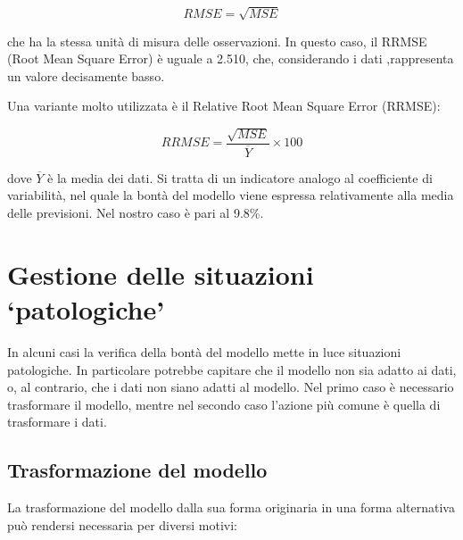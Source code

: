 \documentclass[a4paper,12pt,oneside]{book}
\theoremstyle{definition}
\theoremstyle{definition}
\theoremstyle{definition}
\theoremstyle{remark}
\begin{document}
\[RMSE = \sqrt{MSE}\]

che ha la stessa unità di misura delle osservazioni. In questo caso, il
RRMSE (Root Mean Square Error) è uguale a 2.510, che, considerando i
dati ,rappresenta un valore decisamente basso.

Una variante molto utilizzata è il Relative Root Mean Square Error
(RRMSE):

\[RRMSE = \frac{\sqrt{MSE}} {\overline{Y}} \times 100\]

dove \(\overline{Y}\) è la media dei dati. Si tratta di un indicatore
analogo al coefficiente di variabilità, nel quale la bontà del modello
viene espressa relativamente alla media delle previsioni. Nel nostro
caso è pari al 9.8\%.

\section{\texorpdfstring{Gestione delle situazioni
`patologiche'}{Gestione delle situazioni patologiche}}\label{gestione-delle-situazioni-patologiche}

In alcuni casi la verifica della bontà del modello mette in luce
situazioni patologiche. In particolare potrebbe capitare che il modello
non sia adatto ai dati, o, al contrario, che i dati non siano adatti al
modello. Nel primo caso è necessario trasformare il modello, mentre nel
secondo caso l'azione più comune è quella di trasformare i dati.

\subsection{Trasformazione del
modello}\label{trasformazione-del-modello}

La trasformazione del modello dalla sua forma originaria in una forma
alternativa può rendersi necessaria per diversi motivi:
\end{document}
